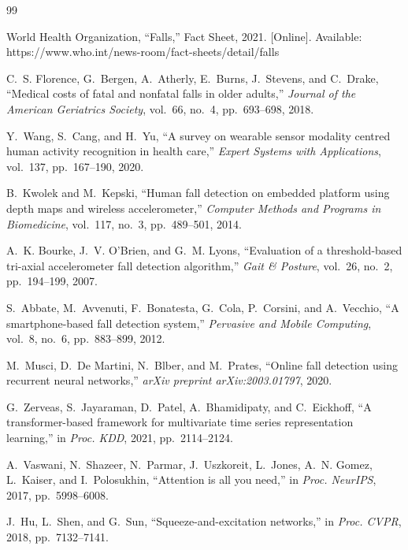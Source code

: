\documentclass[journal,12pt]{IEEEtran}
\begin{document}

\begin{thebibliography}{99}

World Health Organization, ``Falls,'' Fact Sheet, 2021. [Online]. Available: https://www.who.int/news-room/fact-sheets/detail/falls

C.~S. Florence, G.~Bergen, A.~Atherly, E.~Burns, J.~Stevens, and C.~Drake, ``Medical costs of fatal and nonfatal falls in older adults,'' \textit{Journal of the American Geriatrics Society}, vol.~66, no.~4, pp.~693--698, 2018.

Y.~Wang, S.~Cang, and H.~Yu, ``A survey on wearable sensor modality centred human activity recognition in health care,'' \textit{Expert Systems with Applications}, vol.~137, pp.~167--190, 2020.

B.~Kwolek and M.~Kepski, ``Human fall detection on embedded platform using depth maps and wireless accelerometer,'' \textit{Computer Methods and Programs in Biomedicine}, vol.~117, no.~3, pp.~489--501, 2014.

A.~K. Bourke, J.~V. O'Brien, and G.~M. Lyons, ``Evaluation of a threshold-based tri-axial accelerometer fall detection algorithm,'' \textit{Gait \& Posture}, vol.~26, no.~2, pp.~194--199, 2007.

S.~Abbate, M.~Avvenuti, F.~Bonatesta, G.~Cola, P.~Corsini, and A.~Vecchio, ``A smartphone-based fall detection system,'' \textit{Pervasive and Mobile Computing}, vol.~8, no.~6, pp.~883--899, 2012.

M.~Musci, D.~De Martini, N.~Blber, and M.~Prates, ``Online fall detection using recurrent neural networks,'' \textit{arXiv preprint arXiv:2003.01797}, 2020.

G.~Zerveas, S.~Jayaraman, D.~Patel, A.~Bhamidipaty, and C.~Eickhoff, ``A transformer-based framework for multivariate time series representation learning,'' in \textit{Proc. KDD}, 2021, pp.~2114--2124.

A.~Vaswani, N.~Shazeer, N.~Parmar, J.~Uszkoreit, L.~Jones, A.~N. Gomez, L.~Kaiser, and I.~Polosukhin, ``Attention is all you need,'' in \textit{Proc. NeurIPS}, 2017, pp.~5998--6008.

J.~Hu, L.~Shen, and G.~Sun, ``Squeeze-and-excitation networks,'' in \textit{Proc. CVPR}, 2018, pp.~7132--7141.


\end{thebibliography}
\end{document}
